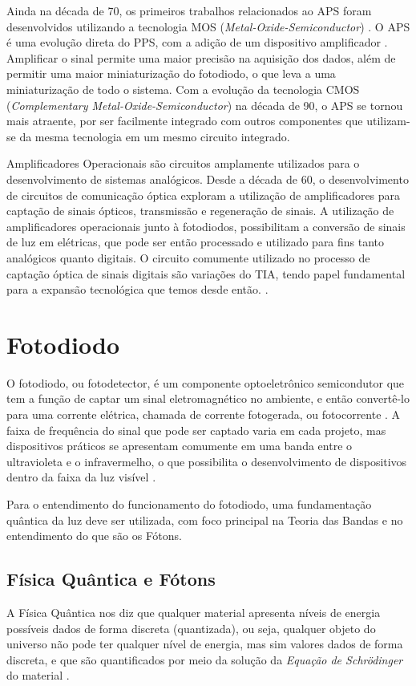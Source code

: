 Ainda na d\'ecada de 70, os primeiros trabalhos relacionados ao APS foram desenvolvidos utilizando a tecnologia MOS (\textit{Metal-Oxide-Semiconductor}) \cite{Peter}. O APS \'e uma evolução direta do PPS, com a adição de um dispositivo amplificador \cite{EstevaoCoelho}. Amplificar o sinal permite uma maior precisão na aquisição dos dados, al\'em de permitir uma maior miniaturização do fotodiodo, o que leva a uma miniaturização de todo o sistema. Com a evolução da tecnologia CMOS (\textit{Complementary Metal-Oxide-Semiconductor}) na d\'ecada de 90, o APS se tornou mais atraente, por ser facilmente integrado com outros componentes que utilizam-se da mesma tecnologia em um mesmo circuito integrado.

Amplificadores Operacionais são circuitos amplamente utilizados para o desenvolvimento de sistemas analógicos. Desde a década de 60, o desenvolvimento de circuitos de comunicação óptica exploram a utilização de amplificadores para captação de sinais ópticos, transmissão e regeneração de sinais. A utilização de amplificadores operacionais junto à fotodiodos, possibilitam a conversão de sinais de luz em elétricas, que pode ser então processado e utilizado para fins tanto analógicos quanto digitais. O circuito comumente utilizado no processo de captação óptica de sinais digitais são variações do TIA, tendo papel fundamental para a expansão tecnológica que temos desde então. \cite{ajoy, andrefontoura}.

\section{Fotodiodo}

O fotodiodo, ou fotodetector, \'e um componente optoeletrônico semicondutor que tem a função de captar um sinal eletromagn\'etico no ambiente, e então convertê-lo para uma corrente el\'etrica, chamada de corrente fotogerada, ou fotocorrente \cite{RazaviOpt}. A faixa de frequência do sinal que pode ser captado varia em cada projeto, mas dispositivos práticos se apresentam comumente em uma banda entre o ultravioleta e o infravermelho, o que possibilita o desenvolvimento de dispositivos dentro da faixa da luz visível \cite{LidianeCampos}.

Para o entendimento do funcionamento do fotodiodo, uma fundamentação quântica da luz deve ser utilizada, com foco principal na Teoria das Bandas e no entendimento do que são os Fótons.

\subsection{Física Quântica e Fótons}
A Física Quântica nos diz que qualquer material apresenta níveis de energia possíveis dados de forma discreta (quantizada), ou seja, qualquer objeto do universo não pode ter qualquer nível de energia, mas sim valores dados de forma discreta, e que são quantificados por meio da solução da \textit{Equação de Schrödinger} do material \cite{Sze, JohnSingleton}.


